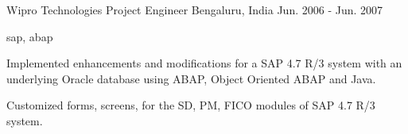 \cventry
    {Wipro Technologies} %
    {Project Engineer} %
    {Bengaluru, India} %
    {Jun. 2006 - Jun. 2007} %
    {
    \begin{cvitems} %
        \item { sap, abap }
        \item { Implemented enhancements and modifications for a SAP 4.7 R/3 system with an underlying Oracle database using ABAP, Object Oriented ABAP and Java.}
        \item { Customized forms, screens, for the SD, PM, FICO modules of SAP 4.7 R/3 system.}
    \end{cvitems}
    }